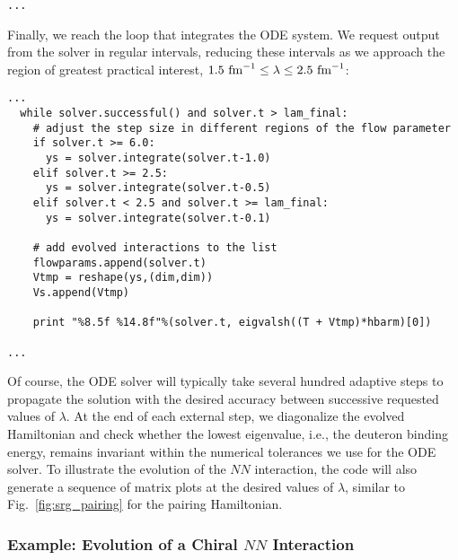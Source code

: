 {\begin{lstlisting}
...
\end{lstlisting}

Finally, we reach the loop that integrates the ODE system. We request
output from the solver in regular intervals, reducing these intervals
as we approach the region of greatest practical interest, 
$1.5\,\,\text{fm}^{-1}\leq \lambda \leq 2.5\,\,\text{fm}^{-1}$: 

\begin{lstlisting}
...
  while solver.successful() and solver.t > lam_final:
    # adjust the step size in different regions of the flow parameter
    if solver.t >= 6.0:
      ys = solver.integrate(solver.t-1.0)
    elif solver.t >= 2.5:
      ys = solver.integrate(solver.t-0.5)
    elif solver.t < 2.5 and solver.t >= lam_final:
      ys = solver.integrate(solver.t-0.1)

    # add evolved interactions to the list
    flowparams.append(solver.t)
    Vtmp = reshape(ys,(dim,dim))
    Vs.append(Vtmp)

    print "%8.5f %14.8f"%(solver.t, eigvalsh((T + Vtmp)*hbarm)[0])

...
\end{lstlisting}

Of course, the ODE solver will typically take several hundred adaptive 
steps to propagate the solution with the desired accuracy between successive 
requested values of $\lambda$. At the end of each external 
step, we diagonalize the evolved Hamiltonian
and check whether the lowest eigenvalue, i.e., the deuteron binding
energy, remains invariant within the numerical tolerances we use for
the ODE solver. To illustrate the evolution of the $NN$ interaction, 
the code will also generate a sequence of matrix plots at the
desired values of $\lambda$, similar to Fig.~\ref{fig:srg_pairing}
for the pairing Hamiltonian.

%
%
\subsubsection{\label{sec:srg_n3lo}Example: Evolution of a Chiral $NN$ Interaction}


}
